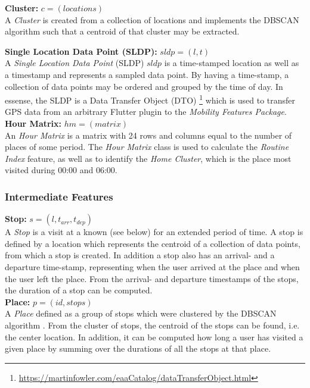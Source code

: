 \textbf{Cluster:} $c = (locations)$\\
A \textit{Cluster} is created from a collection of locations and implements the DBSCAN algorithm \cite{density-based-1996} such that a centroid of that cluster may be extracted.

\textbf{Single Location Data Point (SLDP):} $sldp = (l, t)$\\
A \textit{Single Location Data Point} (SLDP) $sldp$ is a time-stamped location as well as a timestamp and represents a sampled data point. By having a time-stamp, a collection of data points may be ordered and grouped by the time of day. In essense, the SLDP is a Data Transfer Object (DTO) \footnote{\url{https://martinfowler.com/eaaCatalog/dataTransferObject.html}} which is used to transfer GPS data from an arbitrary Flutter plugin to the \textit{Mobility Features Package}.\\

\textbf{Hour Matrix:} $hm = (matrix)$\\
An \textit{Hour Matrix} is a matrix with 24 rows and columns equal to the number of places of some period. The \textit{Hour Matrix} class is used to calculate the \textit{Routine Index }feature, as well as to identify the \textit{Home Cluster}, which is the place most visited during 00:00 and 06:00.

\subsubsection*{Intermediate Features}
\textbf{Stop:} $s = (l, t_{arr}, t_{dep})$\\
A \textit{Stop} is a visit at a known  (see below) for an extended period of time. A stop is defined by a location which represents the centroid of a collection of data points, from which a stop is created. In addition a stop also has an arrival- and a departure time-stamp, representing when the user arrived at the place and when the user left the place. From the arrival- and departure timestamps of the stops, the duration of a stop can be computed.\\

\textbf{Place:} $p = (id, stops)$\\
A \textit{Place} defined as a group of stops which were clustered by the DBSCAN algorithm \cite{density-based-1996}. From the cluster of stops, the centroid of the stops can be found, i.e. the center location. In addition, it can be computed how long a user has visited a given place by summing over the durations of all the stops at that place.\\

